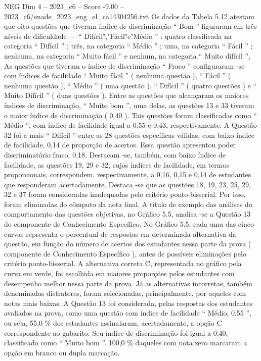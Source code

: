 \begin{textsample}{NEG Dim 4 – 2023\_c6 – Score -9.00 – 2023\_c6/enade\_2023\_eng\_el\_ca14304256.txt}
Os dados da Tabela 5.12 atestam que oito questões que tiveram índice de discriminação “ Bom ” figuraram em três níveis de dificuldade — “ Difícil","Fácil"e"Médio ” : quatro classificada na categoria “ Difícil ” ; três, na categoria “ Médio ” ; uma, na categoria “ Fácil ” ; nenhuma, na categoria “ Muito fácil ” e nenhum, na categoria “ Muito difícil ”, As questões que tiveram o índice de discriminação “ Fraco ” configuraram -se com índices de facilidade “ Muito fácil ” ( nenhuma questão ), “ Fácil ” ( nenhuma questão ), “ Médio ” ( uma questão ), “ Difícil ” ( quatro questões ) e “ Muito Difícil ” ( duas questões ).
Entre as questões que alcançaram os maiores índices de discriminação, “ Muito bom ”, uma delas, as questões 13 e 33 tiveram o maior índice de discriminação ( 0,40 ).
Tais questões foram classificadas como “ Médio ”, com índice de facilidade igual a 0,55 e 0,43, respectivamente.
A Questão 32 foi a mais “ Difícil ” entre as 28 questões específicas válidas, com baixo índice de facilidade, 0,14 de proporção de acertos.
Essa questão apresentou poder discriminatório fraco, 0,18.
Destacam -se, também, com baixo índice de facilidade, as questões 19, 29 e 32, cujos índices de facilidade, em termos proporcionais, correspondem, respectivamente, a 0,16, 0,15 e 0,14 de estudantes que responderam acertadamente.
Destaca -se que as questões 18, 19, 23, 25, 29, 32 e 37 foram consideradas inadequadas pelo critério ponto-bisserial.
Por isso, foram eliminadas do cômputo da nota final.
A título de exemplo das análises do comportamento das questões objetivas, no Gráfico 5.5, analisa -se a Questão 13 do componente de Conhecimento Específico.
No Gráfico 5.5, cada uma das cinco curvas representa o percentual de respostas em determinada alternativa da questão, em função do número de acertos dos estudantes nessa parte da prova ( componente de Conhecimento Específico ), antes de possíveis eliminações pelo critério ponto-bisserial.
A alternativa correta C, representada no gráfico pela curva em verde, foi escolhida em maiores proporções pelos estudantes com desempenho melhor nessa parte da prova.
Já as alternativas incorretas, também denominadas distratores, foram selecionadas, principalmente, por aqueles com notas mais baixas.
A Questão 13 foi considerada, pelas respostas dos estudantes avaliados na prova, como uma questão com índice de facilidade “ Médio, 0,55 ”, ou seja, 55,0 \% dos estudantes assinalaram, acertadamente, a opção C correspondente ao gabarito.
Seu índice de discriminação foi igual a 0,40, classificado como “ Muito bom ”. 100,0 \% daqueles com nota zero marcaram a opção em branco ou dupla marcação.

\end{textsample}
